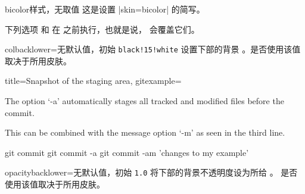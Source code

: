 \clearpage

\begin{docTcbKey}{bicolor}{}{样式，无取值}
  这是设置 |skin=bicolor| 的简写。
\end{docTcbKey}


\begin{dispExample}
\end{dispExample}

\clearpage


\begin{marker}
  下列选项  和 
  在  之前执行，也就是说，
   会覆盖它们。
\end{marker}

\begin{docTcbKey}{colbacklower}{=}{无默认值，初始 \texttt{black!15!white}}
  设置下部的背景 。是否使用该值取决于所用皮肤。
\end{docTcbKey}

\begin{dispExample}

\begin{tcblisting}{title={Snapshot of the staging area},
  gitexample={The option `-a' automatically stages all tracked and modified
              files before the commit.\par
              This can be combined with the message option `-m'
              as seen in the third line.}}
git commit
git commit -a
git commit -am 'changes to my example'
\end{tcblisting}
\end{dispExample}

\smallskip

\begin{docTcbKey}[][doc new=2021-05-21]{opacitybacklower}{=}{无默认值，初始 \texttt{1.0}}
  将下部的背景不透明度设为所给 。
  是否使用该值取决于所用皮肤。
\end{docTcbKey}

